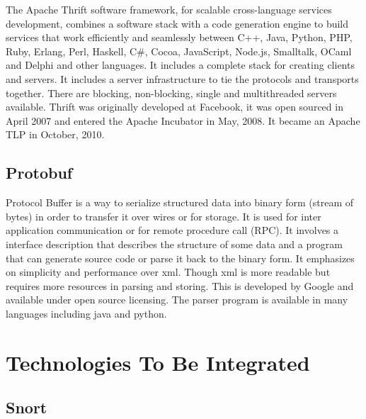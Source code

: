      The Apache Thrift software framework, for scalable cross-language
     services development, combines a software stack with a code generation
     engine to build services that work efficiently and seamlessly between
     C++, Java, Python, PHP, Ruby, Erlang, Perl, Haskell, C\#, Cocoa,
     JavaScript, Node.js, Smalltalk, OCaml and Delphi and other
     languages. \cite{paper-thrift} It includes a complete stack for
     creating clients and servers. It includes a server infrastructure to
     tie the protocols and transports together. There are blocking,
     non-blocking, single and multithreaded servers available.  Thrift was
     originally developed at Facebook, it was open sourced in April 2007
     and entered the Apache Incubator in May, 2008. It became an Apache TLP
     in October, 2010. \cite{www-thrift}
     
\subsection{ Protobuf}

     Protocol Buffer \cite{www-protobuf} is a way to serialize
     structured data into binary form (stream of bytes) in order to
     transfer it over wires or for storage. It is used for inter
     application communication or for remote procedure call (RPC). It
     involves a interface description that describes the structure of
     some data and a program that can generate source code or parse it
     back to the binary form. It emphasizes on simplicity and
     performance over xml. Though xml is more readable but requires
     more resources in parsing and storing.  This is developed by
     Google and available under open source licensing. The parser
     program is available in many languages including java and python.


\section{Technologies To Be Integrated}

\subsection{ Snort}

